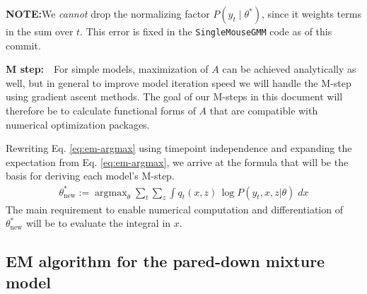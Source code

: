 \documentclass{article}         %
\DeclareMathOperator{\argmax}{\arg\max}
\begin{document}
\textbf{NOTE:}\quad We \textit{cannot} drop the normalizing factor $P(y_t\mid \theta^*)$, since it weights terms in the sum over $t$. This error is fixed in the \texttt{SingleMouseGMM} code as of this commit.

\textbf{M step:}\ \ For simple models, maximization of $A$ can be achieved analytically as well, but in general to improve model iteration speed we will handle the M-step using gradient ascent methods. The goal of our M-steps in this document will therefore be to calculate functional forms of $A$ that are compatible with numerical optimization packages.

Rewriting Eq. \ref{eq:em-argmax} using timepoint independence and expanding the expectation from Eq. \ref{eq:em-argmax}, we arrive at the formula that will be the basis for deriving each model's M-step.
\begin{align}
    \theta^*_{\text{new}} := \argmax_{\theta} \sum_t \sum_{z} \int q_t(x, z)\, \log P(y_t, x, z | \theta) \; dx \label{eq:em-int-argmax}
\end{align}
The main requirement to enable numerical computation and differentiation of $\theta^*_{\text{new}}$ will be to evaluate the integral in $x$. 


\subsection{EM algorithm for the pared-down mixture model}
\label{sec:em-results-pared-down}
\end{document}
